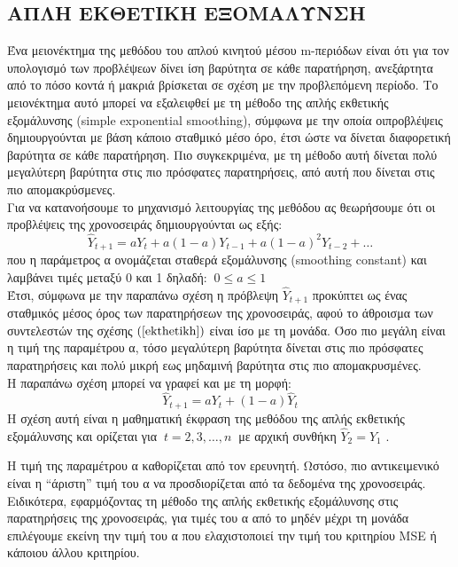 \subsection{ ΑΠΛΗ ΕΚΘΕΤΙΚΗ ΕΞΟΜΑΛΥΝΣΗ}
Ένα μειονέκτημα της μεθόδου του απλού κινητού μέσου m-περιόδων είναι ότι για
τον υπολογισμό των προβλέψεων δίνει ίση βαρύτητα σε κάθε παρατήρηση,
ανεξάρτητα από το πόσο κοντά ή μακριά βρίσκεται σε σχέση με την προβλεπόμενη
περίοδο. Το μειονέκτημα αυτό μπορεί να εξαλειφθεί με τη μέθοδο της απλής
εκθετικής εξομάλυνσης (simple exponential smoothing), σύμφωνα με την οποία οιπροβλέψεις δημιουργούνται με βάση κάποιο σταθμικό μέσο όρο, έτσι ώστε να δίνεται
διαφορετική βαρύτητα σε κάθε παρατήρηση. Πιο συγκεκριμένα, με τη μέθοδο αυτή
δίνεται πολύ μεγαλύτερη βαρύτητα στις πιο πρόσφατες παρατηρήσεις, από αυτή που
δίνεται στις πιο απομακρύσμενες.\\
Για να κατανοήσουμε το μηχανισμό λειτουργίας της μεθόδου ας θεωρήσουμε ότι
οι προβλέψεις της χρονοσειράς δημιουργούνται ως εξής:\\
\begin{equation}
\label{ekthetikh}
 \widehat{Y}_{t + 1} = aY_t + a \left( 1 − a \right) Y_{t − 1} + a \left( 1 − a \right)^2 Y_{t − 2} + \dots 
\end{equation}
που η παράμετρος α ονομάζεται σταθερά εξομάλυνσης (smoothing constant) και
λαμβάνει τιμές μεταξύ 0 και 1 δηλαδή: $ \: 0\leq a\leq 1$\\

Έτσι, σύμφωνα με την παραπάνω σχέση η πρόβλεψη $\widehat{Y}_{t+1} $ προκύπτει ως ένας
σταθμικός μέσος όρος των παρατηρήσεων της χρονοσειράς, αφού το άθροισμα των
συντελεστών της σχέσης $\left(\ref{ekthetikh}\right) $ είναι ίσο με τη μονάδα. Όσο πιο μεγάλη είναι η τιμή της
παραμέτρου α, τόσο μεγαλύτερη βαρύτητα δίνεται στις πιο πρόσφατες παρατηρήσεις
και πολύ μικρή εως μηδαμινή βαρύτητα στις πιο απομακρυσμένες.\\
Η παραπάνω σχέση μπορεί να γραφεί και με τη μορφή:\\
$$ \widehat{Y}_{t + 1} = aY_t + \left( 1 − a \right) \widehat{Y}_t $$
Η σχέση αυτή είναι η μαθηματική έκφραση της μεθόδου της απλής εκθετικής
εξομάλυνσης και ορίζεται για $\:t=2,3,\ldots,n\:$ με αρχική συνθήκη $\widehat{Y}_2 = Y_1$ .

Η τιμή της παραμέτρου α καθορίζεται από τον ερευνητή. Ωστόσο, πιο
αντικειμενικό είναι η “άριστη” τιμή του α να προσδιορίζεται από τα δεδομένα της
χρονοσειράς. Ειδικότερα, εφαρμόζοντας τη μέθοδο της απλής εκθετικής εξομάλυνσης
στις παρατηρήσεις της χρονοσειράς, για τιμές του α από το μηδέν μέχρι τη μονάδα
επιλέγουμε εκείνη την τιμή του α που ελαχιστοποιεί την τιμή του κριτηρίου MSE ή
κάποιου άλλου κριτηρίου.

